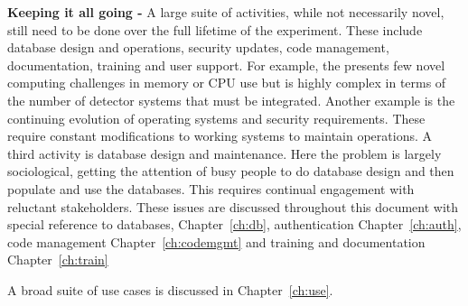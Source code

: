 \documentclass[../main-v1.tex]{subfiles}
\begin{document}
\begin{description}
\item{\bf Keeping it all going -}  %
A large suite of activities, %
while not necessarily novel, %
still need to be done over the full lifetime of the experiment.  These include database design and operations, security updates, code management, documentation, training and user support.   For example, the  presents few novel computing challenges in memory or CPU use but is highly complex in terms of the number of detector systems that must be integrated. Another example is the continuing evolution of operating systems and security requirements.  These require constant modifications to working systems to maintain operations.  A third activity is database design and maintenance. Here the problem is largely sociological, getting the attention of busy people to do database design and then %
populate and use the databases. This requires continual engagement with reluctant stakeholders. These issues are discussed throughout this document with special reference to databases, Chapter~\ref{ch:db}, authentication Chapter~\ref{ch:auth}, code management Chapter~\ref{ch:codemgmt} and training and documentation Chapter~\ref{ch:train}
\end{description}
A broad suite of use cases is discussed in Chapter~\ref{ch:use}.


\end{document}
